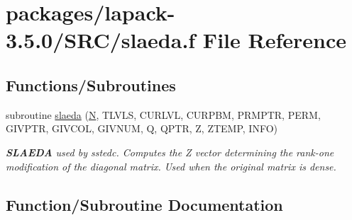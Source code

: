 \hypertarget{slaeda_8f}{}\section{packages/lapack-\/3.5.0/\+S\+R\+C/slaeda.f File Reference}
\label{slaeda_8f}
\subsection*{Functions/\+Subroutines}
\begin{DoxyCompactItemize}
\item 
subroutine \hyperlink{slaeda_8f_a462640bebca7ee618dca01292ef30ddb}{slaeda} (\hyperlink{polmisc_8c_a0240ac851181b84ac374872dc5434ee4}{N}, T\+L\+V\+L\+S, C\+U\+R\+L\+V\+L, C\+U\+R\+P\+B\+M, P\+R\+M\+P\+T\+R, P\+E\+R\+M, G\+I\+V\+P\+T\+R, G\+I\+V\+C\+O\+L, G\+I\+V\+N\+U\+M, Q, Q\+P\+T\+R, Z, Z\+T\+E\+M\+P, I\+N\+F\+O)
\begin{DoxyCompactList}\small\item\em {\bfseries S\+L\+A\+E\+D\+A} used by sstedc. Computes the Z vector determining the rank-\/one modification of the diagonal matrix. Used when the original matrix is dense. \end{DoxyCompactList}\end{DoxyCompactItemize}


\subsection{Function/\+Subroutine Documentation}
\hypertarget{slaeda_8f_a462640bebca7ee618dca01292ef30ddb}{}
